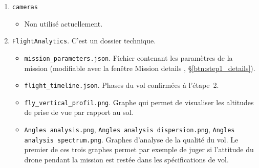 \documentclass[a4paper,11pt]{report}
\begin{document}
\begin{enumerate}
\begin{itemize}
	      	\item \texttt{NIR}
	      	\begin{itemize}
	      		\item \texttt{NIR\_XXXX.dng}. Images de la caméra infrarouge transférées et converties (RAW propriétaire vers dng), 
	      		\item \texttt{NIR\_XXXX.exif}. Fichiers \og compagnons \fg~des images contenant des données exif,   
	      		\item \texttt{time\_line.json}. Fichier qui donne la chronologie des images par rapport à l'horloge de la caméra NIR,
	      		\item \texttt{transfer\_info\_NIR\_dng.json}. Fichier qui résume les choix de l'étape~2,
	      		\item \texttt{NIR\_XXXX\_RawTherapee.tif}. Images\textsuperscript{\ref{fn:rawtherapee_1}} créées à l'étape~4.
	      		\end{itemize}
      		\item \texttt{shoot\_points.json}. Dictionnaire des \emph{shoot points} (prise de vue avec comme référence l'image VIS et l'image NIR la plus proche de l'instant de la prise de vue VIS). Il est créé à l'étape~3.
	    \end{itemize}
	\item \texttt{cameras}
	         \begin{itemize}
	         	\item Non utilisé actuellement.
	         \end{itemize}
	\item \texttt{FlightAnalytics}. C'est un dossier technique.
			\begin{itemize}
				\item \texttt{mission\_parameters.json}. Fichier contenant les paramètres de la mission (modifiable avec la fenêtre \og Mission details \fg, §\ref{btn:step1_details}).
				\item \texttt{flight\_timeline.json}. Phases du vol confirmées à l'étape~2.
				\item \texttt{fly\_vertical\_profil.png}. Graphe qui permet de visualiser les altitudes de prise de vue par rapport au sol.
				\item \texttt{Angles analysis.png},  \texttt{Angles analysis dispersion.png}, \texttt{Angles analysis spectrum.png}. Graphes d'analyse de la qualité du vol. Le premier de ces trois graphes permet par exemple de juger si l'attitude du drone pendant la mission est restée dans les spécifications de vol.
			\end{itemize}

\end{enumerate}
\end{document}
